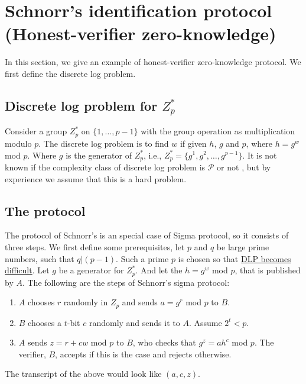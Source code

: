 \documentclass[12pt]{article}
\begin{document}
	
	\section{Schnorr's identification protocol (Honest-verifier zero-knowledge)}
	
	In this section, we give an example of honest-verifier zero-knowledge protocol.  We first define the discrete log problem.
	
	\subsection{Discrete log problem for $Z_p^{*}$}
	
	Consider a group $Z_p^{*}$ on $\{1, \dots, p-1\}$ with the group operation as multiplication modulo $p$.  The discrete log problem is to find $w$ if given $h$, $g$ and $p$, where $h = g^w$ mod $p$.  Where $g$ is the generator of $Z_p^*$, i.e., $Z_p^* = \{g^1, g^2, \dots,g^{p-1}\}$. It is not known if the complexity class of discrete log problem is $\mathcal{P}$ or not \cite{odlyzko2000discrete}, but by experience we assume that this is a hard problem.
	
	\subsection{The protocol}
	
	
	
	
	The protocol of Schnorr's is an special case of Sigma protocol, so it consists of three steps.  We first define some prerequisites, let $p$ and $q$ be large prime numbers, such that $q | (p -1)$.  Such a prime $p$ is chosen so that \href{https://www.doc.ic.ac.uk/~mrh/330tutor/ch06s02.html}{DLP becomes difficult}.  Let $g$ be a generator for $Z_p^*$. And let the $h = g^w $ mod $p$, that is published by $A$. The following are the steps of Schnorr's sigma protocol:
	
	
	\begin{enumerate}
		\item$A$ chooses $r$ randomly in $Z_p$ and sends $a = g^r$ mod $p$ to $B$.
		\item $B$ chooses a $t$-bit $c$ randomly and sends it to $A$. Assume $2^t < p$.
		\item $A$ sends $z = r + cw$ mod $p$ to $B$, who checks that $g^z = ah^c$ mod $p$. The verifier, $B$, accepts if this is the case and rejects otherwise.
	\end{enumerate} 
	
	The transcript of the above would look like $(a, c, z)$. 
	
\end{document}

